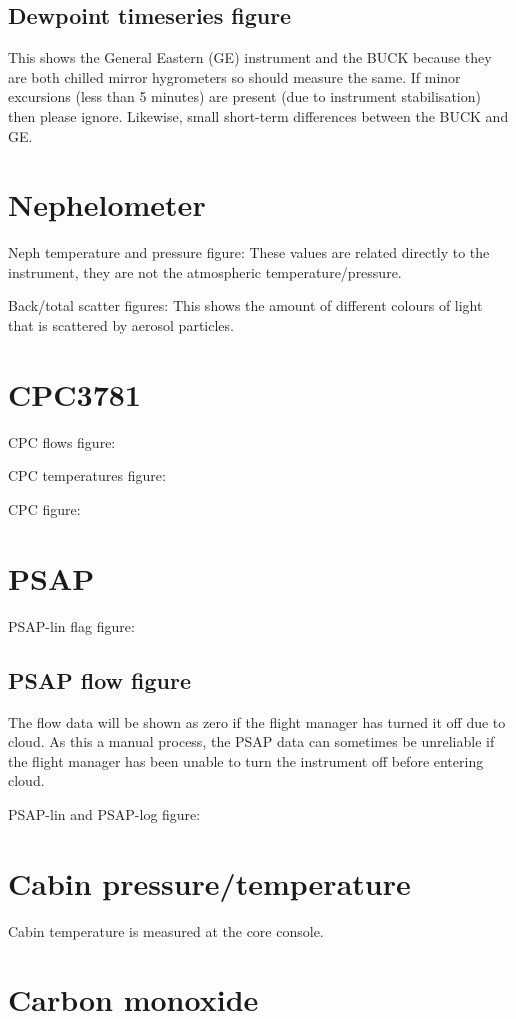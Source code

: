 \subsection*{Dewpoint timeseries figure}
This shows the General Eastern (GE) instrument and the BUCK because they are both chilled mirror hygrometers so should measure the same. If minor excursions (less than 5 minutes) are present (due to instrument stabilisation) 
then please ignore. Likewise, small short-term differences between the BUCK and GE.


\section*{Nephelometer}
Neph temperature and pressure figure:
These values are related directly to the instrument, they are not the atmospheric temperature/pressure. 

Back/total scatter figures:
This shows the amount of different colours of light that is scattered by aerosol particles. 

\section*{CPC3781}
CPC flows figure:

CPC temperatures figure:

CPC figure:


\section*{PSAP}
PSAP-lin flag figure:

\subsection*{PSAP flow figure}
The flow data will be shown as zero if the flight manager has turned it off due to cloud. As this a manual process, the PSAP data can sometimes be unreliable if the flight manager has been unable to 
turn the instrument off before entering cloud. 


PSAP-lin and PSAP-log figure:


\section*{Cabin pressure/temperature}
Cabin temperature is measured at the core console. 

\section*{Carbon monoxide}

